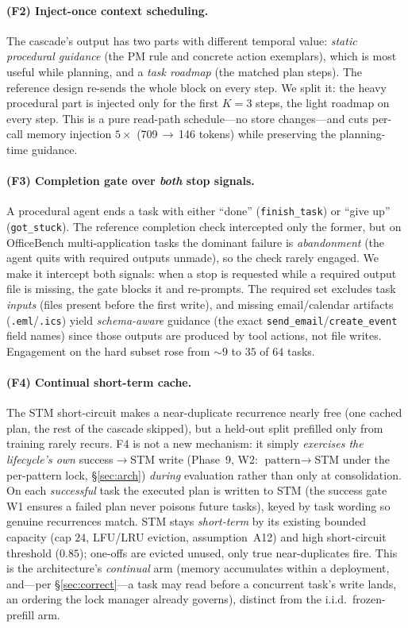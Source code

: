 \documentclass[10pt,twocolumn]{article}
\begin{document}
\paragraph{(F2) Inject-once context scheduling.} The cascade's output has two parts with different
temporal value: \emph{static procedural guidance} (the PM rule and concrete action exemplars), which
is most useful while planning, and a \emph{task roadmap} (the matched plan steps). The reference
design re-sends the whole block on every step. We split it: the heavy procedural part is injected only
for the first $K{=}3$ steps, the light roadmap on every step. This is a pure read-path schedule---no
store changes---and cuts per-call memory injection $5\times$ (709\,$\to$\,146 tokens) while preserving
the planning-time guidance.

\paragraph{(F3) Completion gate over \emph{both} stop signals.} A procedural agent ends a task with
either ``done'' (\texttt{finish\_task}) or ``give up'' (\texttt{got\_stuck}). The reference completion
check intercepted only the former, but on OfficeBench multi-application tasks the dominant failure is
\emph{abandonment} (the agent quits with required outputs unmade), so the check rarely engaged. We
make it intercept both signals: when a stop is requested while a required output file is missing, the
gate blocks it and re-prompts. The required set excludes task \emph{inputs} (files present before the
first write), and missing email/calendar artifacts (\texttt{.eml}/\texttt{.ics}) yield
\emph{schema-aware} guidance (the exact \texttt{send\_email}/\texttt{create\_event} field names) since
those outputs are produced by tool actions, not file writes. Engagement on the hard subset rose from
${\sim}9$ to $35$ of $64$ tasks.

\paragraph{(F4) Continual short-term cache.} The STM short-circuit makes a near-duplicate recurrence
nearly free (one cached plan, the rest of the cascade skipped), but a held-out split prefilled only
from training rarely recurs. F4 is not a new mechanism: it simply \emph{exercises the lifecycle's own}
success$\to$STM write (Phase~9, W2: $\text{pattern}\to$STM under the per-pattern lock, \S\ref{sec:arch})
\emph{during} evaluation rather than only at consolidation. On each \emph{successful} task the executed
plan is written to STM (the success gate W1 ensures a failed plan never poisons future tasks), keyed by
task wording so genuine recurrences match. STM stays \emph{short-term} by its existing bounded capacity
(cap $24$, LFU/LRU eviction, assumption~A12) and high short-circuit threshold ($0.85$); one-offs are
evicted unused, only true near-duplicates fire. This is the architecture's \emph{continual} arm (memory
accumulates within a deployment, and---per \S\ref{sec:correct}---a task may read before a concurrent
task's write lands, an ordering the lock manager already governs), distinct from the i.i.d.\
frozen-prefill arm.
\end{document}
